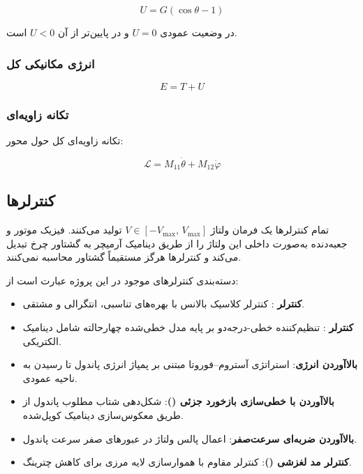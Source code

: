 \begin{equation}
    U = G(\cos\theta - 1)
\end{equation}

در وضعیت عمودی $U = 0$ و در پایین‌تر از آن $U < 0$ است.

\subsubsection{انرژی مکانیکی کل}

\begin{equation}
    E = T + U
\end{equation}

\subsubsection{تکانه زاویه‌ای}

تکانه زاویه‌ای کل حول محور:

\begin{equation}
    \mathcal{L} = M_{11}\dot{\theta} + M_{12}\dot{\varphi}
\end{equation}

\subsection{کنترلرها}

تمام کنترلرها یک فرمان ولتاژ $V \in [-V_{\max},\, V_{\max}]$ تولید می‌کنند. فیزیک موتور و جعبه‌دنده به‌صورت داخلی این ولتاژ را از طریق دینامیک آرمیچر به گشتاور چرخ تبدیل می‌کند و کنترلرها هرگز مستقیماً گشتاور محاسبه نمی‌کنند.

دسته‌بندی کنترلرهای موجود در این پروژه عبارت است از:

\begin{itemize}
    \item \textbf{کنترلر }: کنترلر کلاسیک بالانس با بهره‌های تناسبی، انتگرالی و مشتقی.
    \item \textbf{کنترلر }: تنظیم‌کننده خطی-درجه‌دو بر پایه مدل خطی‌شده چهارحالته شامل دینامیک الکتریکی.
    \item \textbf{بالاآوردن انرژی}: استراتژی آستروم--فوروتا مبتنی بر پمپاژ انرژی پاندول تا رسیدن به ناحیه عمودی.
    \item \textbf{بالاآوردن با خطی‌سازی بازخورد جزئی ()}: شکل‌دهی شتاب مطلوب پاندول از طریق معکوس‌سازی دینامیک کوپل‌شده.
    \item \textbf{بالاآوردن ضربه‌ای سرعت‌صفر}: اعمال پالس ولتاژ در عبورهای صفر سرعت پاندول.
    \item \textbf{کنترلر مد لغزشی ()}: کنترلر مقاوم با هموارسازی لایه مرزی برای کاهش چترینگ.
\end{itemize}

